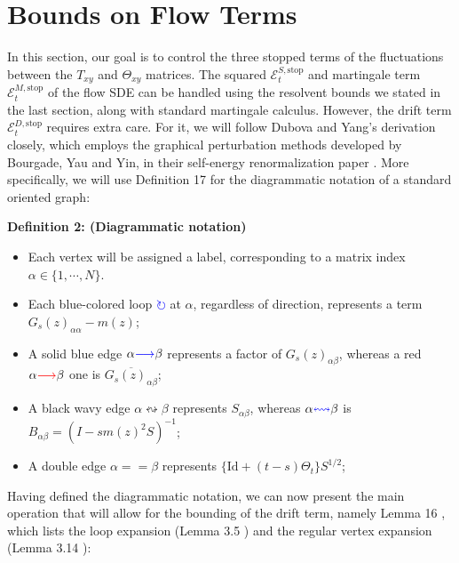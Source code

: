 \documentclass[11pt]{article}
\newenvironment{boxt}[1]
  {\begin{mdframed}\noindent\textbf{#1}\normalfont\space}
  {\end{mdframed}}
\newcommand{\sto}{\text{stop}}
\begin{document}
\newpage
\section{Bounds on Flow Terms}
\label{sec:drift}
In this section, our goal is to control the three stopped terms of the fluctuations between the $T_{xy}$ and $\Theta_{xy}$ matrices. The squared $\mathcal{E}_t^{S, \sto}$ and martingale term $\mathcal{E}_t^{M, \sto}$ of the flow SDE can be handled using the resolvent bounds we stated in the last section, along with standard martingale calculus. However, the drift term $\mathcal{E}^{D, \sto}_t$ requires extra care. For it, we will follow Dubova and Yang's derivation closely, which employs the graphical perturbation methods developed by Bourgade, Yau and Yin, in their self-energy renormalization paper \cite{38}. More specifically, we will use Definition 17  \cite{bandSDE} for the diagrammatic notation of a standard oriented graph:
\vspace{0.255 cm}
\begin{boxt}{Definition 2: (Diagrammatic notation)}\label{def2}
\begin{itemize}
\item Each vertex will be assigned a label, corresponding to a matrix index $\alpha \in \{1, \cdots, N\}$. 
\item Each blue-colored loop \textcolor{blue}{$\circlearrowright$} at $\alpha$, regardless of direction, represents a term $G_s(z)_{\alpha\alpha} - m(z)$;
\item A solid blue edge  $\alpha\textcolor{blue}{\longrightarrow}\beta$ represents a factor of $G_s(z)_{\alpha\beta}$, whereas a red $\alpha\textcolor{red}{\longrightarrow}\beta$ one is $\overline{G_s(z)_{\alpha\beta}}$;
\item A black wavy edge $\alpha\leftrightsquigarrow \beta$ represents $S_{\alpha\beta}$, whereas $\alpha\textcolor{blue}{\leftrightsquigarrow} \beta$ is $B_{\alpha\beta} = (I-sm(z)^2S)^{-1}$; 
\item A double edge $\alpha =\!=\beta$ represents $\{\text{Id}+(t-s)\Theta_t\}S^{1/2}$;
\end{itemize}
\end{boxt}
Having defined the diagrammatic notation, we can now present the main operation that will allow for the bounding of the drift term, namely Lemma 16 \cite{bandSDE}, which lists the loop expansion (Lemma 3.5 \cite{38}) and the regular vertex expansion (Lemma 3.14 \cite{38}): 
\end{document}
